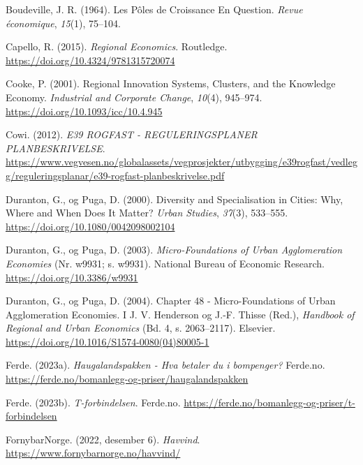 \documentclass[
]{article}
\newlength{\cslhangindent}
\newlength{\cslentryspacingunit} %
\newenvironment{CSLReferences}[2] %
 {%
  \setlength{\parindent}{0pt}
  \ifodd #1
  \let\oldpar\par
  \def\par{\hangindent=\cslhangindent\oldpar}
  \fi
  \setlength{\parskip}{#2\cslentryspacingunit}
 }%
 {}
\begin{document}
\begin{CSLReferences}{1}{0}
\leavevmode{}%
Boudeville, J. R. (1964). Les Pôles de Croissance En Question.
\emph{Revue économique}, \emph{15}(1), 75--104.

\leavevmode{}%
Capello, R. (2015). \emph{Regional {Economics}}. {Routledge}.
\url{https://doi.org/10.4324/9781315720074}

\leavevmode{}%
Cooke, P. (2001). Regional {Innovation Systems}, {Clusters}, and the
{Knowledge Economy}. \emph{Industrial and Corporate Change},
\emph{10}(4), 945--974. \url{https://doi.org/10.1093/icc/10.4.945}

\leavevmode{}%
Cowi. (2012). \emph{E39 ROGFAST - REGULERINGSPLANER PLANBESKRIVELSE}.
\url{https://www.vegvesen.no/globalassets/vegprosjekter/utbygging/e39rogfast/vedlegg/reguleringsplanar/e39-rogfast-planbeskrivelse.pdf}

\leavevmode{}%
Duranton, G., og Puga, D. (2000). Diversity and {Specialisation} in
{Cities}: {Why}, {Where} and {When Does} It {Matter}? \emph{Urban
Studies}, \emph{37}(3), 533--555.
\url{https://doi.org/10.1080/0042098002104}

\leavevmode{}%
Duranton, G., og Puga, D. (2003). \emph{Micro-{Foundations} of {Urban
Agglomeration Economies}} (Nr. w9931; s. w9931). {National Bureau of
Economic Research}. \url{https://doi.org/10.3386/w9931}

\leavevmode{}%
Duranton, G., og Puga, D. (2004). Chapter 48 - {Micro-Foundations} of
{Urban Agglomeration Economies}. I J. V. Henderson og J.-F. Thisse
(Red.), \emph{Handbook of {Regional} and {Urban Economics}} (Bd. 4, s.
2063--2117). {Elsevier}.
\url{https://doi.org/10.1016/S1574-0080(04)80005-1}

\leavevmode{}%
Ferde. (2023a). \emph{Haugalandspakken - Hva betaler du i bompenger?}
{Ferde.no}. \url{https://ferde.no/bomanlegg-og-priser/haugalandspakken}

\leavevmode{}%
Ferde. (2023b). \emph{T-forbindelsen}. {Ferde.no}.
\url{https://ferde.no/bomanlegg-og-priser/t-forbindelsen}

\leavevmode{}%
FornybarNorge. (2022, desember 6). \emph{Havvind}.
\url{https://www.fornybarnorge.no/havvind/}


\end{CSLReferences}
\end{document}
